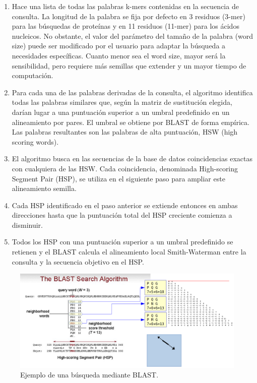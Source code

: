 \begin{enumerate}
\item Hace una lista de todas las palabras k-mers contenidas en la secuencia de consulta. La longitud de la palabra se fija por defecto en 3 residuos (3-mer) para las búsquedas de proteínas y en 11 residuos (11-mer) para los ácidos nucleicos. No obstante, el valor del parámetro del tamaño de la palabra (word size) puede ser modificado por el usuario para adaptar la búsqueda a necesidades específicas. Cuanto menor sea el word size, mayor será la sensibilidad, pero requiere más semillas que extender y un mayor tiempo de computación. 
\item Para cada una de las palabras derivadas de la consulta, el algoritmo identifica todas las palabras similares que, según la matriz de sustitución elegida, darían lugar a una puntuación superior a un umbral predefinido en un alineamiento por pares. El umbral se obtiene por BLAST de forma empírica. Las palabras resultantes son las palabras de alta puntuación, HSW (high scoring words).
\item El algoritmo busca en las secuencias de la base de datos coincidencias exactas con cualquiera de las HSW. Cada coincidencia, denominada High-scoring Segment Pair (HSP), se utiliza en el siguiente paso para ampliar este alineamiento semilla.
\item Cada HSP identificado en el paso anterior se extiende entonces en ambas direcciones hasta que la puntuación total del HSP creciente comienza a disminuir.
\item Todos los HSP con una puntuación superior a un umbral predefinido se retienen y el BLAST calcula el alineamiento local Smith-Waterman entre la consulta y la secuencia objetivo en el HSP.
\end{enumerate}

\begin{figure}[htbp]
\centering
\includegraphics[width = \textwidth]{figs/blast-algorithm.png}
\caption{Ejemplo de una búsqueda mediante BLAST.}
\end{figure}

